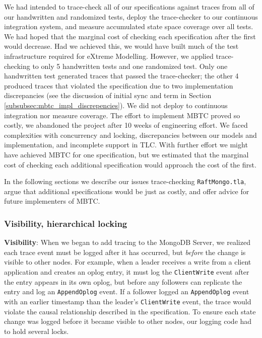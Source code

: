 \documentclass{vldb}
\begin{document}
We had intended to trace-check all of our specifications against traces from all of our handwritten and randomized tests, deploy the trace-checker to our continuous integration system, and measure accumulated state space coverage over all tests. 
We had hoped that the marginal cost of checking each specification after the first would decrease.
Had we achieved this, we would have built much of the test infrastructure required for eXtreme Modelling.
However, we applied trace-checking to only 5 handwritten tests and one randomized test. 
Only one handwritten test generated traces that passed the trace-checker; the other 4 produced traces that violated the specification due to two implementation discrepancies (see the discussion of initial sync and term in Section \ref{subsubsec:mbtc_impl_discrepencies}). 
We did not deploy to continuous integration nor measure coverage. 
The effort to implement MBTC proved so costly, we abandoned the project after 10 weeks of engineering effort. 
We faced complexities with concurrency and locking, discrepancies between our models and implementation, and incomplete support in TLC. 
With further effort we might have achieved MBTC for one specification, but we estimated that the marginal cost of checking each additional specification would approach the cost of the first.

In the following sections we describe our issues trace-checking \texttt{RaftMongo.tla}, argue that additional specifications would be just as costly, and offer advice for future implementers of MBTC.

\subsubsection{Visibility, hierarchical locking}
\label{subsubsec:mbtc_locking}

\textbf{Visibility}: When we began to add tracing to the MongoDB Server, we realized each trace event must be logged after it has occurred, but \textit{before} the change is visible to other nodes. 
For example, when a leader receives a write from a client application and creates an oplog entry, it must log the \texttt{ClientWrite} event after the entry appears in its own oplog, but before any followers can replicate the entry and log an \texttt{AppendOplog} event. 
If a follower logged an \texttt{AppendOplog} event with an earlier timestamp than the leader's \texttt{ClientWrite} event, the trace would violate the causal relationship described in the specification. 
To ensure each state change was logged before it became visible to other nodes, our logging code had to hold several locks.
\end{document}
